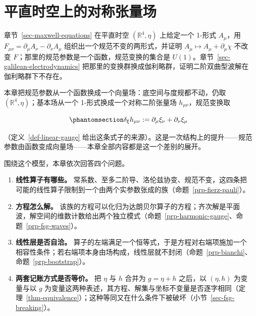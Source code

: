 \documentclass[
  chinese,
  a4paper,
  UTF8,
  12pt,
  oneside,
  openany]{ctexbook}
\providecommand{\tightlist}{%
  \setlength{\itemsep}{0pt}\setlength{\parskip}{0pt}}
\theoremstyle{plain}
\theoremstyle{plain}
\theoremstyle{plain}
\theoremstyle{definition}
\theoremstyle{plain}
\theoremstyle{plain}
\theoremstyle{remark}
\begin{document}

\chapter{平直时空上的对称张量场}\label{sec-flat-space-gravity}

章节~\ref{sec-maxwell-equations} 在平直时空 \((\mathbb{R}^{4},\eta)\)
上给定一个 1-形式 \(A_{\mu}\)，用
\(F_{\mu\nu}=\partial_{\mu}A_{\nu}-\partial_{\nu}A_{\mu}\)
组织出一个规范不变的两形式，并证明
\(A_{\mu}\mapsto A_{\mu}+\partial_{\mu}\chi\) 不改变
\(F\)；那里的规范参数是一个函数，规范变换的集合是
\(U(1)\)。章节~\ref{sec-galilean-electrodynamics}
把那里的变换群换成伽利略群，证明二阶双曲型波解在伽利略群下不存在。

本章把规范参数从一个函数换成一个向量场：底空间与度规都不动，仍取
\((\mathbb{R}^{4},\eta)\)；基本场从一个 1-形式换成一个对称二阶张量场
\(h_{\mu\nu}\)，规范变换取

\begin{equation}\protect\phantomsection\label{eq-gauge-preview}{
\delta_{\xi}h_{\mu\nu}:=\partial_{\mu}\xi_{\nu}+\partial_{\nu}\xi_{\mu}
}\end{equation}

（定义~\ref{def-linear-gauge}
给出这条式子的来源）。这是一次结构上的提升------规范参数由函数变成向量场------本章全部内容都是这一个差别的展开。

围绕这个模型，本章依次回答四个问题。

\begin{enumerate}
\def\labelenumi{\arabic{enumi}.}
\tightlist
\item
  \textbf{线性算子有哪些。}
  常系数、至多二阶导、洛伦兹协变、规范不变，这四条把可能的线性算子限制到一个由两个实参数张成的族（命题~\ref{prp-fierz-pauli}）。
\item
  \textbf{方程怎么解。}
  该族的方程可以化归为达朗贝尔算子的方程；齐次解是平面波，解空间的维数计数给出两个独立模式（命题~\ref{prp-harmonic-gauge}、命题~\ref{prp-fsg-waves}）。
\item
  \textbf{线性层是否自洽。}
  算子的左端满足一个恒等式，于是方程对右端项施加一个相容性条件；若右端项本身由场构成，线性层就不封闭（命题~\ref{prp-bianchi}、命题~\ref{prp-bootstrap}）。
\item
  \textbf{两套记账方式是否等价。} 把 \(\eta\) 与 \(h\) 合并为
  \(g=\eta+h\) 之后，以 \((\eta,h)\) 为变量与以 \(g\)
  为变量这两种表述，其方程、解集与坐标不变量是否逐字相同（定理~\ref{thm-equivalence}）；这种等同又在什么条件下被破坏（小节~\ref{sec-fsg-breaking}）。
\end{enumerate}
\end{document}
